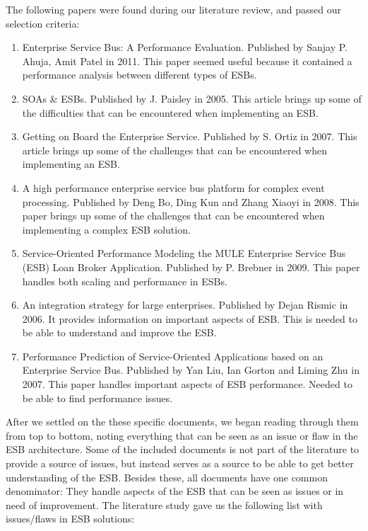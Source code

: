\documentclass{llncs}
\begin{document}
The following papers were found during our literature review, and passed our selection criteria:
\begin{enumerate}
\item Enterprise Service Bus: A Performance Evaluation\cite{sanjay11}. Published by Sanjay P. Ahuja, Amit Patel in 2011. This paper seemed useful because it contained a performance analysis between different types of ESBs.
\item SOAs \& ESBs\cite{paisley05}. Published by J. Paisley in 2005. This article brings up some of the difficulties that can be encountered when implementing an ESB.
\item Getting on Board the Enterprise Service\cite{ortiz07}. Published by S. Ortiz in 2007. This article brings up some of the challenges that can be encountered when implementing an ESB.
\item A high performance enterprise service bus platform for complex event processing\cite{bo08}. Published by Deng Bo,  Ding Kun and Zhang Xiaoyi in 2008. This paper brings up some of the challenges that can be encountered when implementing a complex ESB solution.
\item Service-Oriented Performance Modeling the MULE Enterprise Service Bus (ESB) Loan Broker Application\cite{brebner09}. Published by P. Brebner in 2009. This paper handles both scaling and performance in ESBs.
\item An integration strategy for large enterprises\cite{risimic06}. Published by Dejan Rismic in 2006. It provides information on important aspects of ESB. This is needed to be able to understand and improve the ESB.
\item Performance Prediction of Service-Oriented Applications based on an Enterprise Service Bus\cite{gorton07}. Published by Yan Liu, Ian Gorton and Liming Zhu in 2007. This paper handles important aspects of ESB performance. Needed to be able to find performance issues.
\end{enumerate}

After we settled on the these specific documents, we began reading through them from top to bottom, noting everything that can be seen as an issue or flaw in the ESB architecture.
Some of the included documents is not part of the literature to provide a source of issues, but instead serves as a source to be able to get better understanding of the ESB.
Besides these, all documents have one common denominator: They handle aspects of the ESB that can be seen as issues or in need of improvement.
The literature study gave us the following list with issues/flaws in ESB solutions:
\end{document}
